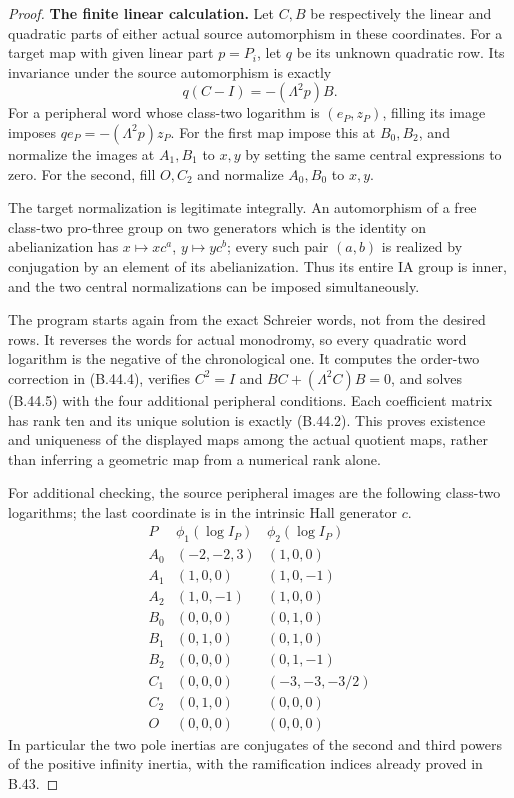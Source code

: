 \begin{proof}
\par\smallskip\noindent\textbf{The finite linear calculation.}
Let $C,B$ be respectively the linear and quadratic parts of either
actual source automorphism in these coordinates.  For a target
map with given linear part $p=P_i$, let $q$ be its unknown
quadratic row.  Its invariance under the source automorphism is
exactly
\[
              q(C-I)=-(\Lambda^2p)B.                       \tag{B.44.5}
\]
For a peripheral word whose class-two logarithm is $(e_P,z_P)$,
filling its image imposes
$q e_P=-(\Lambda^2p)z_P$.
For the first map impose this at $B_0,B_2$, and normalize the
images at $A_1,B_1$ to $x,y$ by setting the same central
expressions to zero.  For the second, fill $O,C_2$ and normalize
$A_0,B_0$ to $x,y$.

The target normalization is legitimate integrally.  An
automorphism of a free class-two pro-three group on two generators
which is the identity on abelianization has
$x\mapsto xc^a$, $y\mapsto yc^b$; every such pair $(a,b)$ is
realized by conjugation by an element of its abelianization.
Thus its entire IA group is inner, and the two central
normalizations can be imposed simultaneously.

The program starts again from the exact Schreier words, not
from the desired rows.  It reverses the words for actual
monodromy, so every quadratic word logarithm is the negative
of the chronological one.  It computes the order-two correction
in (B.44.4), verifies $C^2=I$ and
$BC+(\Lambda^2C)B=0$, and solves (B.44.5) with the four
additional peripheral conditions.  Each coefficient matrix
has rank ten and its unique solution is exactly (B.44.2).
This proves existence and uniqueness of the displayed maps
among the actual quotient maps, rather than inferring a
geometric map from a numerical rank alone.

For additional checking, the source peripheral images are
the following class-two logarithms; the last coordinate is
in the intrinsic Hall generator $c$.
\[
\begin{array}{c|c|c}
 P&\phi_1(\log I_P)&\phi_2(\log I_P)\\\hline
 A_0&(-2,-2,3)&(1,0,0)\\
 A_1&(1,0,0)&(1,0,-1)\\
 A_2&(1,0,-1)&(1,0,0)\\
 B_0&(0,0,0)&(0,1,0)\\
 B_1&(0,1,0)&(0,1,0)\\
 B_2&(0,0,0)&(0,1,-1)\\
 C_1&(0,0,0)&(-3,-3,-3/2)\\
 C_2&(0,1,0)&(0,0,0)\\
 O&(0,0,0)&(0,0,0)
\end{array}                                                  \tag{B.44.6}
\]
In particular the two pole inertias are conjugates of the
second and third powers of the positive infinity inertia,
with the ramification indices already proved in B.43.


\end{proof}
